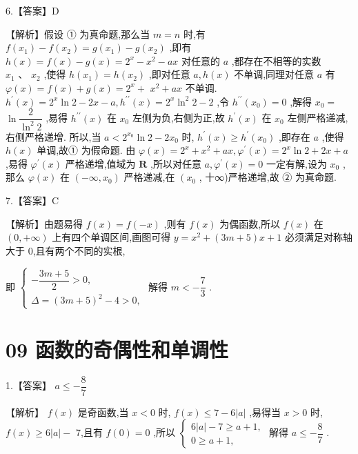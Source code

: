 \documentclass[10pt]{article}
\begin{document}
6.【答案】D

【解析】假设 ① 为真命题,那么当 $m = n$ 时,有 $f\left( {x}_{1}\right)  - f\left( {x}_{2}\right)  = g\left( {x}_{1}\right)  - g\left( {x}_{2}\right)$ ,即有 $h\left( x\right)  = f\left( x\right)  - g\left( x\right)  = {2}^{x} - {x}^{2} - {ax}$ 对任意的 $a$ ,都存在不相等的实数 ${x}_{1}\text{ 、 }{x}_{2}$ ,使得 $h\left( {x}_{1}\right)  = h\left( {x}_{2}\right)$ ,即对任意 $a,h\left( x\right)$ 不单调,同理对任意 $a$ 有 $\varphi \left( x\right)  = f\left( x\right)  + g\left( x\right)  = {2}^{x} +$  ${x}^{2} + {ax}$ 不单调. ${h}^{\prime }\left( x\right)  = {2}^{x}\ln 2 - {2x} - a,{h}^{\prime \prime }\left( x\right)  = {2}^{x}{\ln }^{2}2 - 2$ ,令 ${h}^{\prime \prime }\left( {x}_{0}\right)  = 0$ ,解得 ${x}_{0} =$  $\ln \dfrac{2}{{\ln }^{2}2}$ ,易得 ${h}^{\prime \prime }\left( x\right)$ 在 ${x}_{0}$ 左侧为负,右侧为正,故 ${h}^{\prime }\left( x\right)$ 在 ${x}_{0}$ 左侧严格递减,右侧严格递增. 所以,当 $a < {2}^{{x}_{0}}\ln 2 - 2{x}_{0}$ 时, ${h}^{\prime }\left( x\right)  \geq  {h}^{\prime }\left( {x}_{0}\right)$ ,即存在 $a$ ,使得 $h\left( x\right)$ 单调,故① 为假命题. 由 $\varphi \left( x\right)  = {2}^{x} + {x}^{2} + {ax},{\varphi }^{\prime }\left( x\right)  = {2}^{x}\ln 2 + {2x} + a$ ,易得 ${\varphi }^{\prime }\left( x\right)$ 严格递增,值域为 $\mathbf{R}$ ,所以对任意 $a,{\varphi }^{\prime }\left( x\right)  = 0$ 一定有解,设为 ${x}_{0}$ ,那么 $\varphi \left( x\right)$ 在 $\left( {-\infty ,{x}_{0}}\right)$ 严格递减,在 $\left( {x}_{0}\right.$ , 十∞)严格递增,故 ② 为真命题.

7.【答案】C

【解析】由题易得 $f\left( x\right)  = f\left( {-x}\right)$ ,则有 $f\left( x\right)$ 为偶函数,所以 $f\left( x\right)$ 在 $\left( {0, + \infty }\right)$ 上有四个单调区间,画图可得 $y = {x}^{2} + \left( {{3m} + 5}\right) x + 1$ 必须满足对称轴大于 0,且有两个不同的实根,

即 $\left\{  \begin{array}{l}  - \dfrac{{3m} + 5}{2} > 0, \\  \Delta  = {\left( 3m + 5\right) }^{2} - 4 > 0, \end{array}\right.$ 解得 $m <  - \dfrac{7}{3}$ .

\section*{09 函数的奇偶性和单调性}

1.【答案】 $a \leq   - \dfrac{8}{7}$

【解析】 $f\left( x\right)$ 是奇函数,当 $x < 0$ 时, $f\left( x\right)  \leq  7 - 6\left| a\right|$ ,易得当 $x > 0$ 时, $f\left( x\right)  \geq  6\left| a\right|  -$ 7,且有 $f\left( 0\right)  = 0$ ,所以 $\left\{  \begin{array}{l} 6\left| a\right|  - 7 \geq  a + 1, \\  0 \geq  a + 1, \end{array}\right.$ 解得 $a \leq   - \dfrac{8}{7}$ .
\end{document}
